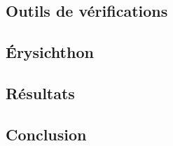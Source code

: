 \documentclass[10pt,a5paper]{article}
\begin{document}
\subsection*{Outils de vérifications}
\subsection*{Érysichthon}
\subsection*{Résultats}
\subsection*{Conclusion}
\end{document}
